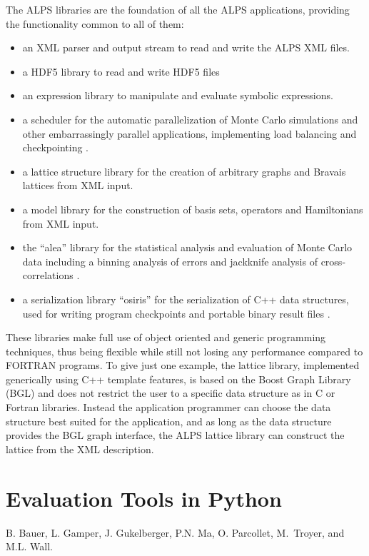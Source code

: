 \documentclass[12pt]{iopart}
\begin{document}
The ALPS libraries are the foundation of all the ALPS applications, providing the functionality common to all of them:
\begin{itemize}
\item an XML parser and output stream to read and write the ALPS XML files.
\item a HDF5 library to read and write HDF5 files
\item an expression library to manipulate and evaluate symbolic expressions.
\item a scheduler for the automatic parallelization of Monte Carlo simulations and other embarrassingly parallel applications, implementing load balancing and checkpointing \cite{palm}.
\item a lattice structure library for the creation of arbitrary graphs and Bravais lattices from XML input.
\item a model library for the construction of basis sets, operators and Hamiltonians from XML input.
\item the ``alea'' library for the statistical analysis and evaluation of Monte Carlo data including a binning analysis of errors and jackknife analysis of cross-correlations \cite{palm}.
\item a serialization library ``osiris'' for the serialization of C++ data structures, used for writing program checkpoints and portable binary result files \cite{palm}.
\end{itemize}
These libraries make full use of object oriented and generic\cite{CE} programming techniques, thus being flexible while still not losing any performance compared to FORTRAN programs. To give just one example, the lattice library, implemented generically using C++ template features, is based on the Boost Graph Library\cite{BGL,boost} (BGL) and does not restrict the user to a specific data structure as in C or Fortran libraries. Instead the application programmer can choose the data structure best suited for the application, and as long as the data structure provides the BGL graph interface, the ALPS lattice library can construct the lattice from the XML description.




\section{Evaluation Tools in Python} \label{sct:python}
 B. Bauer, L. Gamper, J. Gukelberger, P.N. Ma, O. Parcollet, M.~Troyer, and M.L. Wall. 
\end{document}
